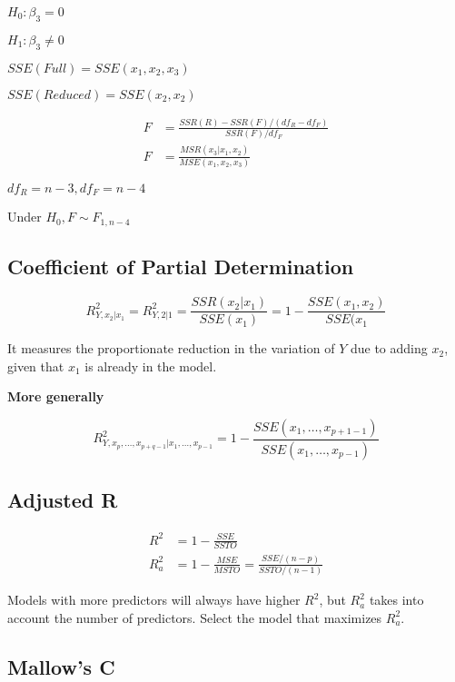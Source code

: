 \documentclass[10pt]{article}
\begin{document}
\begin{multicols}{3}
    $H_0: \beta_3 = 0$

    $H_1: \beta_3 \ne 0$

    $SSE(Full) = SSE(x_1, x_2, x_3)$

    $SSE(Reduced) = SSE(x_2, x_2)$

    \begin{align}
        F & = \frac{SSR(R) - SSR(F)/(df_R - df_F)}{SSR(F)/df_F} \\
        F & = \frac{MSR(x_3 | x_1, x_2)}{MSE(x_1, x_2, x_3)}
    \end{align}
    
    $df_R = n - 3, df_F = n - 4$ 

    Under $H_0, F \sim F_{1, n-4}$

    \subsection{Coefficient of Partial Determination}
    
    \begin{equation}
        R^2_{Y,x_2|x_1} = R^2_{Y,2|1} = \frac{SSR(x_2|x_1)}{SSE(x_1)} = 1 - \frac{SSE(x_1,x_2)}{SSE(x_1}
    \end{equation}

    It measures the proportionate reduction in the variation of $Y$ due to adding $x_2$, given that $x_1$ is already in the model.

    \textbf{More generally}

    \begin{equation}
        R^2_{Y,x_p, \dots, x_{p+q-1} | x_1, \dots, x_{p-1}} = 1 - \frac{SSE(x_1,\dots,x_{p+1-1})}{SSE(x_1,\dots,x_{p-1})}
    \end{equation}

    \subsection{Adjusted R}

    \begin{align}
        R^2 & = 1 - \frac{SSE}{SSTO} \\
        R^2_a & = 1 - \frac{MSE}{MSTO} = \frac{SSE/(n-p)}{SSTO/(n-1)}
    \end{align}

    Models with more predictors will always have higher $R^2$, but $R^2_a$ takes into account the number of predictors. Select the model that maximizes $R^2_a$.

    \subsection{Mallow's C}


\end{multicols}
\end{document}
